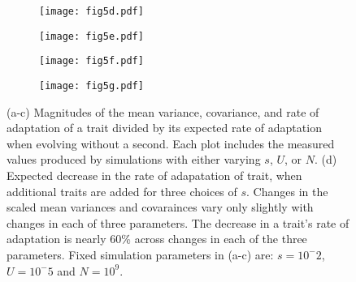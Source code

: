 \documentclass[11pt,twocolumn]{article}
\begin{document}
\begin{figure}[h!]
\begin{subfigure}[b!]{0.48\linewidth}
\centering
\texttt{[image: fig5d.pdf]}
\caption{}
\end{subfigure}
\begin{subfigure}[b!]{0.48\linewidth}
\centering
\texttt{[image: fig5e.pdf]}
\caption{}
\end{subfigure}

\begin{subfigure}[b]{0.48\linewidth}
\centering
\texttt{[image: fig5f.pdf]}
\caption{}
\end{subfigure}
\begin{subfigure}[b]{0.48\linewidth}
\centering
\texttt{[image: fig5g.pdf]}
\caption{}
\end{subfigure}

\label{fig}
\caption{\footnotesize 
(a-c) Magnitudes of the mean variance, covariance, and rate of adaptation of a trait divided by its expected rate of adaptation when evolving without a second. Each plot includes the measured values produced by simulations with either varying $s$, $U$, or $N$. (d) Expected decrease in the rate of adapatation of trait, when additional traits are added for three choices of $s$. Changes in the scaled mean variances and covarainces vary only slightly with changes in each of three parameters. The decrease in a trait's rate of adaptation is nearly 60\% across changes in each of the three parameters. Fixed simulation parameters in (a-c) are: $s=10^-2$, $U=10^-5$ and $N=10^9$.}
\end{figure}
\end{document}
